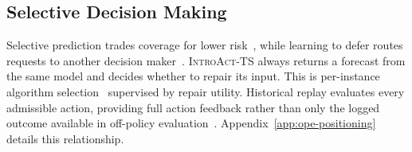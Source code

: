 \documentclass{article}
\newcommand{\introact}{\textsc{IntroAct-TS}}
\begin{document}
\subsection{Selective Decision Making}
\label{sec:related-selective}
Selective prediction trades coverage for lower risk~\citep{chow1970optimum,vovk2005algorithmic,geifman2017selective,lei2018distribution},
while learning to defer routes requests to another decision maker~\citep{madras2018predict,mozannar2020consistent}.
\introact{} always returns a forecast from the same model and decides whether to repair its input.
This is per-instance algorithm selection~\citep{rice1976algorithm,xu2008satzilla} supervised by repair utility.
Historical replay evaluates every admissible action, providing full action feedback rather than
only the logged outcome available in off-policy evaluation~\citep{dudik2011doubly,swaminathan2015counterfactual}.
Appendix~\ref{app:ope-positioning} details this relationship.
\end{document}
